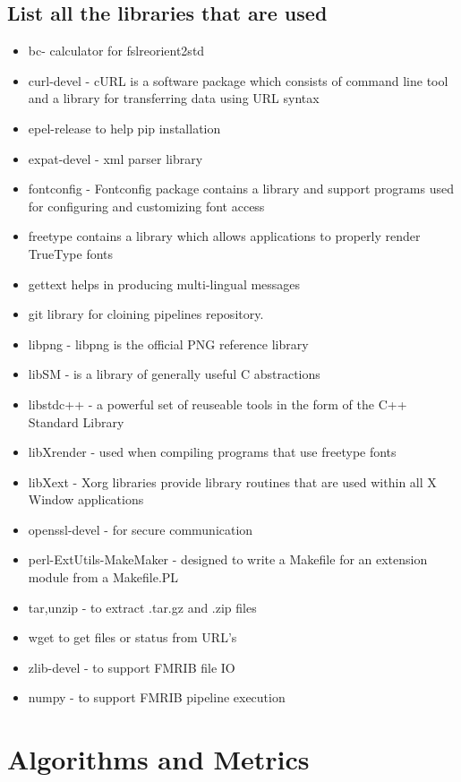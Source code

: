 \subsection{List all the libraries that are used}
\begin{itemize}
 \item bc- calculator for fslreorient2std
 \item curl-devel - cURL is a software package which consists of command line tool and a library for transferring data using URL syntax
 \item epel-release to help pip installation
 \item expat-devel - xml parser library
\item fontconfig - Fontconfig package contains a library and support programs used for configuring and customizing font access
 \item freetype contains a library which allows applications to properly render TrueType fonts
 \item gettext helps in producing multi-lingual messages
\item git library for cloining pipelines repository.
\item libpng - libpng is the official PNG reference library
\item libSM - is a library of generally useful C abstractions
\item libstdc++ - a powerful set of reuseable tools in the form of the C++ Standard Library
\item libXrender - used when compiling programs that use freetype fonts
\item libXext - Xorg libraries provide library routines that are used within all X Window applications
\item openssl-devel - for secure communication
\item perl-ExtUtils-MakeMaker - designed to write a Makefile for an extension module from a Makefile.PL
\item tar,unzip - to extract .tar.gz and .zip files
\item wget to get files or status from URL's
\item zlib-devel - to support FMRIB file IO
\item numpy - to support FMRIB pipeline execution
\end{itemize}

\section{Algorithms and Metrics}
